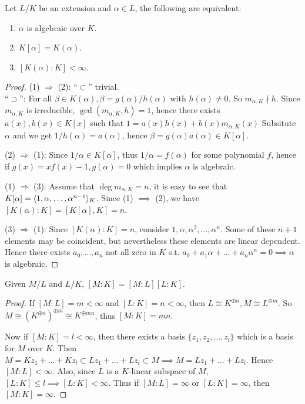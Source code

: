 \begin{prop}
  Let $L/K$ be an extension and $\alpha \in L$, the following are equivalent:
  \begin{enumerate}[(\arabic*)]
    \item $\alpha$ is algebraic over $K$.
    \item $K[\alpha] = K(\alpha)$.
    \item $[K(\alpha): K] < \infty$.
  \end{enumerate}

  \begin{proof}
    (1) $\Rightarrow$ (2): ``$\subset$'' trivial. \\
    ``$\supset$'': For all $\beta \in K(\alpha), \beta = g(\alpha) / h(\alpha)$ with $h(\alpha) \neq 0$.
    So $m_{\alpha, K} \nmid h$. Since $m_{\alpha, K}$ is irreducible, $\gcd(m_{\alpha, K}, h) = 1$,
    hence there exists $a(x), b(x) \in K[x]$ such that $1 = a(x) h(x) + b(x) m_{\alpha, K}(x)$
    Subsitute $\alpha$ and we get $1/h(\alpha) = a(\alpha)$, hence $\beta = g(\alpha) a(\alpha) \in K[\alpha]$.

    (2) $\Rightarrow$ (1): Since $1 / \alpha \in K[\alpha]$, thus $1 / \alpha = f(\alpha)$ for some
    polynomial $f$, hence if $g(x) = xf(x) - 1, g(\alpha) = 0$ which implies $\alpha$ is algebraic.

    (1) $\Rightarrow$ (3): Assume that $\deg m_{\alpha, K} = n$, it is easy to see that
    $K[\alpha] = \langle 1, \alpha, \dots, \alpha^{n-1} \rangle_K$. Since (1) $\implies$ (2),
    we have $[K(\alpha): K] = [K[\alpha], K] = n$.

    (3) $\Rightarrow$ (1): Since $[K(\alpha): K] = n$, consider $1, \alpha, \alpha^2, \dots, \alpha^n$.
    Some of these $n+1$ elements may be coincident, but nevertheless these elements are linear dependent.
    Hence there exists $a_0, \dots, a_n$ not all zero in $K$ s.t.
    $a_0 + a_1 \alpha + \dots + a_n \alpha^n = 0 \implies \alpha$ is algebraic.
  \end{proof}
\end{prop}

\begin{prop}
  Given $M/L$ and $L/K$, $[M: K] = [M: L] [L: K]$.

  \begin{proof}
    If $[M:L] = m < \infty$ and $[L:K] = n < \infty$, then $L \cong K^{\oplus n}, M \cong L^{\oplus m}$.
    So $M \cong \left( K^{\oplus n} \right)^{\oplus m} \cong K^{\oplus mn}$, thus $[M: K] = mn$.

    Now if $[M: K] = l < \infty$, then there exists a basis $\{ z_1, z_2, \dots, z_l \}$
    which is a basis for $M$ over $K$. Then $M = K z_1 + \dots + K z_l \subset L z_1 +
    \dots + L z_l \subset M \implies M = L z_1 + \dots + L z_l$. Hence $[M: L] < \infty$.
    Also, since $L$ is a $K$-linear subspace of $M$, $[L: K] \leq l \implies [L: K] < \infty$.
    Thus if $[M: L] = \infty$ or $[L: K] = \infty$, then $[M: K] = \infty$.
  \end{proof}
\end{prop}

